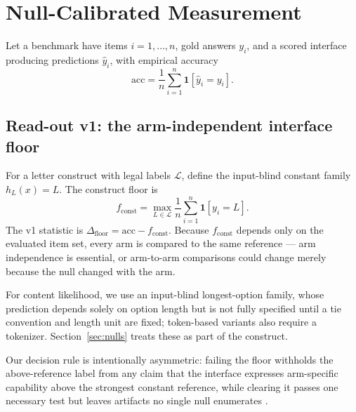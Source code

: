 \section{Null-Calibrated Measurement}

Let a benchmark have items $i=1,\ldots,n$, gold answers $y_{i}$, and a scored interface producing predictions $\hat{y}_{i}$, with empirical accuracy
\begin{equation}
    \mathrm{acc}=\frac{1}{n}\sum_{i=1}^{n}\mathbf{1}[\hat{y}_{i}=y_{i}].
\end{equation}

\subsection{Read-out v1: the arm-independent interface floor}

For a letter construct with legal labels $\mathcal{L}$, define the input-blind constant family $h_{L}(x)=L$. The construct floor is
\begin{equation}
    f_{\mathrm{const}}=\max_{L\in\mathcal{L}}\frac{1}{n}\sum_{i=1}^{n}\mathbf{1}[y_{i}=L].
\end{equation}
The v1 statistic is $\Delta_{\mathrm{floor}}=\mathrm{acc}-f_{\mathrm{const}}$. Because $f_{\mathrm{const}}$ depends only on the evaluated item set, every arm is compared to the same reference --- arm independence is essential, or arm-to-arm comparisons could change merely because the null changed with the arm.

For content likelihood, we use an input-blind longest-option family, whose prediction depends solely on option length but is not fully specified until a tie convention and length unit are fixed; token-based variants also require a tokenizer. Section~\ref{sec:nulls} treats these as part of the construct.

Our decision rule is intentionally asymmetric: failing the floor withholds the above-reference label from any claim that the interface expresses arm-specific capability above the strongest constant reference, while clearing it passes one necessary test but leaves artifacts no single null enumerates \citep{feng2019misleading}.

